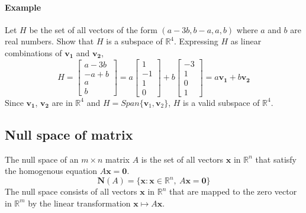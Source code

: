 \documentclass[../linear-algebra.tex]{subfiles}
\begin{document}
\paragraph{Example} Let $H$ be the set of all vectors of the form $(a-3b, b-a, a, b)$ where $a$ and $b$ are real numbers. Show that $H$ is a subspace of $\mathbb{R}^4$.\newline
Expressing $H$ as linear combinations of $\mathbf{v_1}$ and $\mathbf{v_2}$,
\[H = \begin{bmatrix} a - 3b \\ -a + b \\ a \\ b \end{bmatrix} = a \begin{bmatrix} 1 \\ -1 \\ 1 \\ 0 \end{bmatrix} + b \begin{bmatrix} -3 \\ 1 \\ 0 \\ 1 \end{bmatrix} = a\mathbf{v_1} + b\mathbf{v_2}\]
Since $\mathbf{v_1}$, $\mathbf{v_2}$ are in $\mathbb{R}^4$ and $H = Span\{\mathbf{v}_1, \mathbf{v}_2\}$, $H$ is a valid subspace of $\mathbb{R}^4$.


\subsection{Null space of matrix}
The null space of an $m \times n$ matrix $A$ is the set of all vectors $\mathbf{x}$ in $\mathbb{R}^n$
that satisfy the homogenous equation $A\mathbf{x}=\mathbf{0}$.
\[\mathbf{N}(A) = \{\mathbf{x}: \mathbf{x} \in \mathbb{R}^n,\: A\mathbf{x} = \mathbf{0}\}\]
The null space consists of all vectors $\mathbf{x}$ in $\mathbb{R}^n$ that are mapped to the zero vector in $\mathbb{R}^m$ by the linear transformation $\mathbf{x} \mapsto A\mathbf{x}$.
\end{document}
